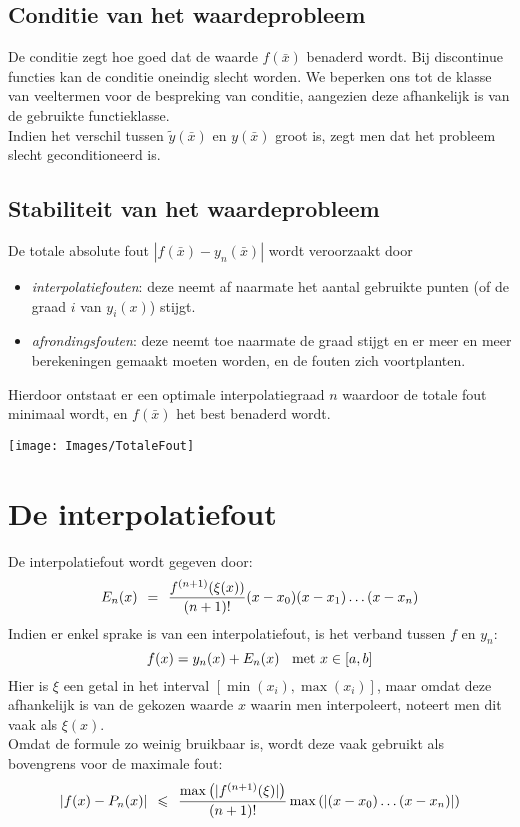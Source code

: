 \documentclass[11pt]{report}
\def \eq {\hspace{1.5mm}=\hspace{1.5mm}}
\def \lesseq {\hspace{1.5mm}\leqslant\hspace{1.5mm}}
\def \h {\hspace{2mm}}
\def \v {\vspace{2mm}}
\begin{document}
\subsection{Conditie van het waardeprobleem}
	De conditie zegt hoe goed dat de waarde $f(\bar x)$ benaderd wordt. Bij discontinue functies kan de conditie oneindig slecht worden. We beperken ons tot de klasse van veeltermen voor de bespreking van conditie, aangezien deze afhankelijk is van de gebruikte functieklasse. \v\\
	Indien het verschil tussen $\tilde y(\bar x)$ en $y(\bar x)$ groot is, zegt men dat het probleem slecht geconditioneerd is.
	
\subsection{Stabiliteit van het waardeprobleem}
	De totale absolute fout $|f(\bar x) - y_n(\bar x)|$ wordt veroorzaakt door
	\begin{itemize}
		\item \textit{interpolatiefouten}: deze neemt af naarmate het aantal gebruikte punten (of de graad $i$ van $y_i(x)$) stijgt.
		\item \textit{afrondingsfouten}: deze neemt toe naarmate de graad stijgt en er meer en meer berekeningen gemaakt moeten worden, en de fouten zich voortplanten.
	\end{itemize} 
	Hierdoor ontstaat er een optimale interpolatiegraad $n$ waardoor de totale fout minimaal wordt, en $f(\bar x)$ het best benaderd wordt.
	\begin{center}
		\texttt{[image: Images/TotaleFout]}
	\end{center}
\section{De interpolatiefout}
	De interpolatiefout wordt gegeven door:
	\begin{equation}
		E_n(x) \eq \frac{f^{(n+1)}(\xi(x))}{(n+1)!}(x-x_0)(x-x_1) \dots (x-x_n)
	\end{equation}
	Indien er enkel sprake is van een interpolatiefout, is het verband tussen $f$ en $y_n$:
	$$f(x) = y_n(x) + E_n(x) \h\text{ met } x \in [a, b]$$
	Hier is $\xi$ een getal in het interval $[\min(x_i), \max(x_i)]$, maar omdat deze afhankelijk is van de gekozen waarde $x$ waarin men interpoleert, noteert men dit vaak als $\xi(x)$.\v\\
	Omdat de formule zo weinig bruikbaar is, wordt deze vaak gebruikt als bovengrens voor de maximale fout:
	\begin{equation}
		|f(x) - P_n(x)| \lesseq \frac{\max\left(|f^{(n+1)}(\xi)|\right)}{(n+1)!}\max\left(|(x-x_0)\dots(x-x_n)| \right)
	\end{equation}
	
\end{document}
